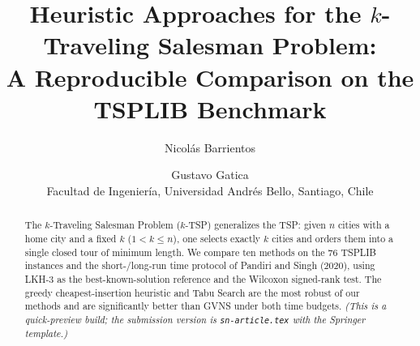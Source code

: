 \documentclass[11pt]{article}
\title{Heuristic Approaches for the $k$-Traveling Salesman Problem:\\
A Reproducible Comparison on the TSPLIB Benchmark}
\author{Nicol\'as Barrientos \and Gustavo Gatica\\[2pt]
\small Facultad de Ingenier\'ia, Universidad Andr\'es Bello, Santiago, Chile}
\date{}
\begin{document}
\maketitle
\begin{abstract}
\noindent The $k$-Traveling Salesman Problem ($k$-TSP) generalizes the TSP:
given $n$ cities with a home city and a fixed $k$ ($1<k\le n$), one selects
exactly $k$ cities and orders them into a single closed tour of minimum length.
We compare ten methods on the 76 TSPLIB instances and the short-/long-run time
protocol of Pandiri and Singh (2020), using LKH-3 as the best-known-solution
reference and the Wilcoxon signed-rank test. The greedy cheapest-insertion
heuristic and Tabu Search are the most robust of our methods and are significantly
better than GVNS under both time budgets. \emph{(This is a quick-preview build; the
submission version is \texttt{sn-article.tex} with the Springer template.)}
\end{abstract}





\end{document}

